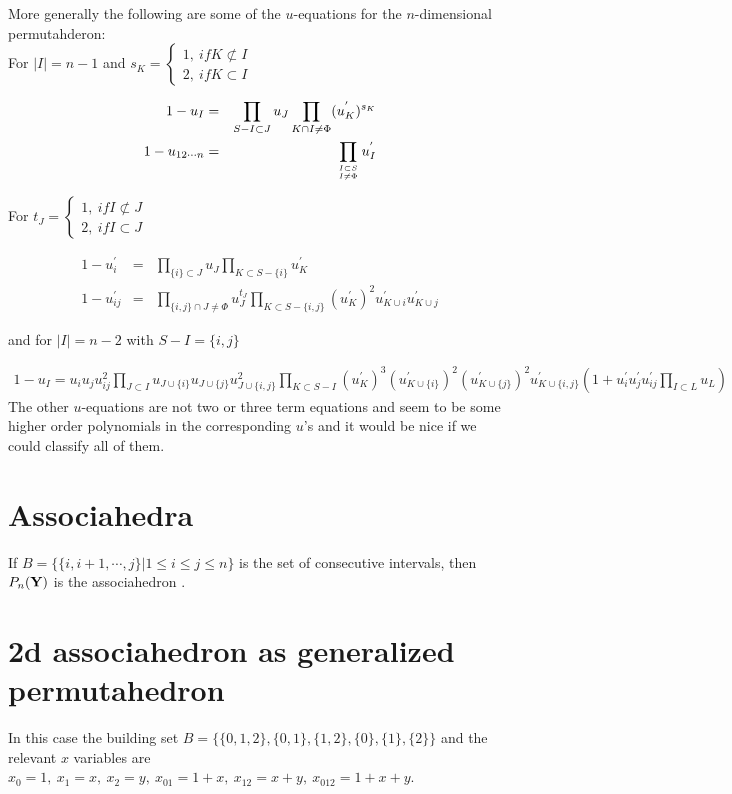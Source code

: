 \documentclass[hidelinks,12pt]{article}
\newcommand{\bea}[1]{\begin{eqnarray}\label{#1} }
\newcommand{\eea}{\end{eqnarray}}
\def\bea{\begin{eqnarray}}
\def\eea{\end{eqnarray}}
\begin{document}
More generally the following are some of the $u$-equations for the $n$-dimensional permutahderon:\\

For $|I| =n-1$ and $s_K = \begin{cases}  1,~ if K \not\subset I & \\ 2, ~if K \subset I\end{cases}$

\bea
1-u_{I} &=& \prod_ {S - I \subset J } u_{J} \prod_ {K \cap I \ne \Phi } (u^{'}_{K})^{s_K}  \nonumber \\
1-u_{12\cdots n} &=& \prod_ {{I \subset S}\atop {I \ne \Phi}} u^{'}_{I} \nonumber
\eea

For $t_J = \begin{cases}  1,~ if I  \not\subset J & \\ 2, ~if I \subset J \end{cases}$

\bea
1-u^{'}_{i} &=& \prod_ {\{ i \} \subset J } u_{J} \prod_ {K \subset S- \{i\} } u^{'}_{K} \nonumber \\
1-u^{'}_{i j} &=& \prod_ {\{i,j \}\cap J \ne \Phi} u^{t_J}_{J} \prod_ {K \subset S-\{i, j \} } (u^{'}_{K})^{2} u^{'}_{K \cup {i}} u^{'}_{K \cup{j} } \nonumber 
\eea

and for $|I| =n-2$ with $S- I = \{i, j\}$

\bea
1-u_{I}= u_i u_j u^{2}_{ij} \prod_{J \subset I} u_{J \cup \{i\}} u_{J \cup \{j\}} u^{2}_{J \cup \{i,j\}} \prod_{K \subset S-I} (u^{'}_K)^{3} (u^{'}_{K \cup \{i\}})^{2}  (u^{'}_{K \cup\{j\}})^{2}  u^{'}_{K\cup \{i,j\}} \left( 1+ u^{'}_i u^{'}_j u^{'}_{ij} \prod_{I \subset L} u_L \right)                       \nonumber
\eea
The other $u$-equations are not two or three term equations and seem to be some higher  order polynomials in the corresponding $u$'s and it would be nice if we could classify all of them.

\section*{Associahedra}
If $B=\{ \{i,i+1,\cdots,j \} | 1\leq  i \leq j \leq n\}$ is the set of consecutive intervals, then $P_n({\bf Y})$ is the associahedron .
\section*{2d associahedron as generalized permutahedron}
In this case the building set $B=\{ \{ 0,1,2\},\{ 0,1\},\{1,2\},\{0\},\{1\},\{2\}\}$ and the relevant $x$ variables are $x_0=1, ~x_1=x, ~x_2=y, ~x_{01}=1+x,~ x_{12}=x+y,~ x_{012}=1+x+y$. 
\end{document}
